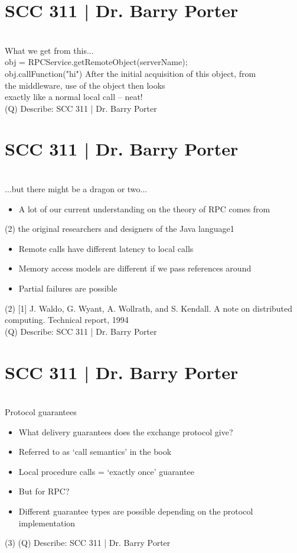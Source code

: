 \documentclass[12pt]{article}
\begin{document}
\section{SCC 311 | Dr. Barry Porter}
\\
What we get from this...\\
obj = RPCService.getRemoteObject(serverName);\\
obj.callFunction("hi") After the initial acquisition of this object, from\\
the middleware, use of the object then looks\\
exactly like a normal local call – neat!\\
\clearpage
(Q)
Describe: SCC 311 | Dr. Barry Porter
\clearpage
\section{SCC 311 | Dr. Barry Porter}
\\
...but there might be a dragon or two...\\
\begin{itemize}
  \item A lot of our current understanding on the theory of RPC comes from 
\end{itemize}(2)
the original researchers and designers of the Java language1\\
\begin{itemize}
  \item Remote calls have different latency to local calls
  \item Memory access models are different if we pass references around
  \item Partial failures are possible
\end{itemize}(2)
[1] J. Waldo, G. Wyant, A. Wollrath, and S. Kendall. A note on distributed computing. Technical report, 1994\\
\clearpage
(Q)
Describe: SCC 311 | Dr. Barry Porter
\clearpage
\section{SCC 311 | Dr. Barry Porter}
\\
Protocol guarantees\\
\begin{itemize}
  \item What delivery guarantees does the exchange protocol give?
  \item Referred to as ‘call semantics’ in the book
  \item Local procedure calls = ‘exactly once’ guarantee
  \item But for RPC?
  \item Different guarantee types are possible depending on the protocol implementation
\end{itemize}(3)
\clearpage
(Q)
Describe: SCC 311 | Dr. Barry Porter
\clearpage
\end{document}
